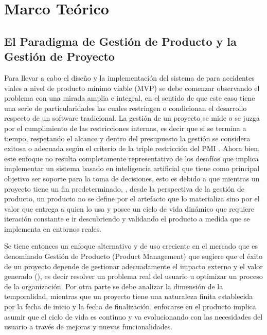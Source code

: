 \chapter{Marco Teórico}\label{marco-teorico}

\section{El Paradigma de Gestión de Producto y la Gestión de Proyecto}\label{el-paradigma-de-gestiuxf3n-de-producto-y-la-gestiuxf3n-de-proyecto}

Para llevar a cabo el diseño y la implementación del sistema de  para accidentes viales a nivel de producto mínimo viable (MVP) se debe comenzar observando el problema con una mirada amplia e integral, en el sentido de que este caso tiene una serie de particularidades las cuales restringen o condicionan el desarrollo respecto de un software tradicional. La gestión de un proyecto se mide o se juzga por el cumplimiento de las restricciones internas, es decir que si se termina a tiempo, respetando el alcance y dentro del presupuesto la gestión se considera exitosa o adecuada según el criterio de la triple restricción del PMI \autocite{pmi2021}. Ahora bien, este enfoque no resulta completamente representativo de los desafíos que implica implementar un sistema basado en inteligencia artificial que tiene como principal objetivo ser soporte para la toma de decisiones, esto es debido a que mientras un proyecto tiene un fin predeterminado, , desde la perspectiva de la gestión de producto, un producto no se define por el artefacto que lo materializa sino por el valor que entrega a quien lo usa y posee un ciclo de vida dinámico que requiere iteración constante  \autocite{cagan2018} e ir descubriendo y validando el producto a medida que se implementa en entornos reales.

Se tiene entonces un enfoque alternativo y de uso creciente en el mercado que es denominado Gestión de Producto (Product Management) que sugiere que el éxito de un proyecto depende de gestionar adecuadamente el impacto externo y el valor generado (), es decir resolver un problema real del usuario u optimizar un proceso de la organización. Por otra parte se debe analizar la dimensión de la temporalidad, mientras que un proyecto tiene una naturaleza finita establecida por la fecha de inicio y la fecha de finalización, enfocarse en el producto implica asumir que el ciclo de vida es continuo y va evolucionando con las necesidades del usuario a través de mejoras y nuevas funcionalidades.

